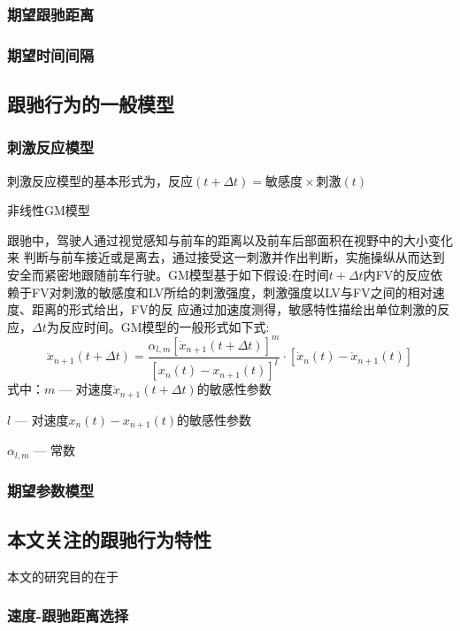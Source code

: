 \subsubsection{期望跟驰距离}

\subsubsection{期望时间间隔}



\subsection{跟驰行为的一般模型}
\subsubsection{刺激反应模型}
刺激反应模型的基本形式为，$反应(t+\Delta t)=敏感度{\times}刺激(t)$

非线性GM模型 

跟驰中，驾驶人通过视觉感知与前车的距离以及前车后部面积在视野中的大小变化来
判断与前车接近或是离去，通过接受这一刺激并作出判断，实施操纵从而达到安全而紧密地跟随前车行驶。GM模型基于如下假设:在时间$t+\Delta t$内FV的反应依赖于FV对刺激的敏感度和LV所给的刺激强度，刺激强度以LV与FV之间的相对速度、距离的形式给出，FV的反
应通过加速度测得，敏感特性描绘出单位刺激的反应，$\Delta t$为反应时间。GM模型的一般形式如下式:
\begin{equation}
\ddot{x}_{n+1}(t+\Delta t)=\frac{\alpha_{l,m}[\dot{x}_{n+1}(t+\Delta t)]^m}{[x_n(t)-x_{n+1}(t)]^l}\cdot [\dot{x}_n(t)-\dot{x}_{n+1}(t)]
\end{equation}
式中：$m$ --- 对速度$\dot{x}_{n+1}(t+\Delta t)$的敏感性参数

$l$ --- 对速度$x_n(t)-x_{n+1}(t)$的敏感性参数

$\alpha_{l,m}$ --- 常数

\subsubsection{期望参数模型}

\subsection{本文关注的跟驰行为特性}
本文的研究目的在于
\subsubsection{速度-跟驰距离选择}

